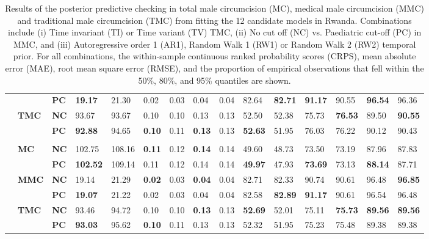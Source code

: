 {\begin{table}[H]
\begin{tabular}{>{\bfseries}p{0.05cm} p{0.85cm} p{0.75cm} C{1.25cm} C{1.25cm} C{1.25cm} C{1.25cm} C{1.25cm} C{1.25cm} C{1.25cm} C{1.25cm} C{1.25cm} C{1.25cm} C{1.25cm} C{1.25cm}}
  &  & \bf PC & \bf 19.17 &  21.30 &   0.02 &   0.03 &   0.04 &   0.04 &  82.64 & \bf 82.71 & \bf 91.17 &  90.55 & \bf 96.54 &  96.36\\[3pt] 
  & \bf TMC & \bf NC &  93.67 &  93.67 &   0.10 &   0.10 &   0.13 &   0.13 &  52.50 &  52.38 &  75.73 & \bf 76.53 &  89.50 & \bf 90.55\\ 
  &  & \bf PC & \bf 92.88 &  94.65 & \bf  0.10 &   0.11 & \bf  0.13 &   0.13 & \bf 52.63 &  51.95 &  76.03 &  76.22 &  90.12 &  90.43\\[3pt] 
     \\ 
 & \bf MC & \bf NC & 102.75 & 108.16 & \bf  0.11 &   0.12 & \bf  0.14 &   0.14 &  49.60 &  48.73 &  73.50 &  73.19 &  87.96 &  87.83\\ 
  &  & \bf PC & \bf102.52 & 109.14 &   0.11 &   0.12 &   0.14 &   0.14 & \bf 49.97 &  47.93 & \bf 73.69 &  73.13 & \bf 88.14 &  87.71\\[3pt] 
  & \bf MMC & \bf NC &  19.14 &  21.29 & \bf  0.02 &   0.03 & \bf  0.04 &   0.04 &  82.71 &  82.33 &  90.74 &  90.61 &  96.48 & \bf 96.85\\ 
  &  & \bf PC & \bf 19.07 &  21.22 &   0.02 &   0.03 &   0.04 &   0.04 &  82.58 & \bf 82.89 & \bf 91.17 &  90.61 &  96.54 &  96.48\\[3pt] 
  & \bf TMC & \bf NC &  93.46 &  94.72 &   0.10 &   0.10 & \bf  0.13 &   0.13 & \bf 52.69 &  52.01 &  75.11 & \bf 75.73 & \bf 89.56 & \bf 89.56\\ 
  &  & \bf PC & \bf 93.03 &  95.62 & \bf  0.10 &   0.11 &   0.13 &   0.13 &  52.32 &  51.95 &  75.23 &  75.48 &  89.38 &  89.38\\[3pt] 
  \hline 
  \end{tabular} 
  \caption{Results of the posterior predictive checking in total male circumcision (MC), medical male circumcision (MMC) and traditional male circumcision (TMC) from fitting the 12 candidate models in Rwanda. Combinations include (i) Time invariant (TI) or Time variant (TV) TMC, (ii) No cut off (NC) vs. Paediatric cut-off (PC) in MMC, and (iii) Autoregressive order 1 (AR1), Random Walk 1 (RW1) or Random Walk 2 (RW2) temporal prior. For all combinations, the within-sample continuous ranked probability scores (CRPS), mean absolute error (MAE), root mean square error (RMSE), and the proportion of empirical observations that fell within the 50\%, 80\%, and 95\% quantiles are shown.} 
  \label{tab::PPC1RWA} 
\end{table}} 


